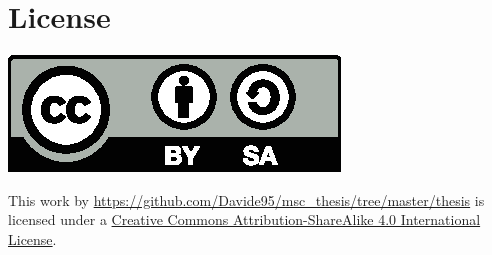 \chapter*{License}
\begin{center}
    \includegraphics{images/cc.eps}

    This work by \url{https://github.com/Davide95/msc_thesis/tree/master/thesis} is licensed under a \linebreak
    \href{https://creativecommons.org/licenses/by-sa/4.0/}{Creative Commons Attribution-ShareAlike 4.0 International License}.
\end{center}
